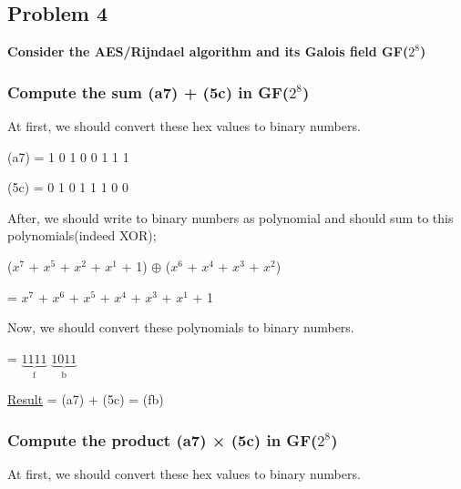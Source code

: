 \documentclass[11pt]{article}
\begin{document}
\newpage
\subsection{Problem 4}
\textbf{Consider the AES/Rijndael algorithm and its Galois field GF($2^{8}$)}
\subsubsection{Compute the sum (a7) + (5c) in GF($2^{8}$)}

At first, we should convert these hex values to binary numbers.\\

\begin{center}
  (a7) = 1 0 1 0 0 1 1 1
\end{center}

\begin{center}
  (5c) = 0 1 0 1 1 1 0 0
\end{center}



After, we should write to binary numbers as polynomial and should sum to this polynomials(indeed XOR);\\


\begin{center}
  ($x^{7}$ + $x^{5}$ + $x^{2}$ + $x^{1}$ + 1) $\oplus$ ($x^{6}$ + $x^{4}$ + $x^{3}$ + $x^{2}$)\\
\end{center}

\begin{center}
  = $x^{7}$ + $x^{6}$ + $x^{5}$ + $x^{4}$ + $x^{3}$ + $x^{1}$ + 1\\
\end{center}


Now, we should convert these polynomials to binary numbers.\\

\begin{center}
  = $\underbrace{1 1 1 1}_\text{f}$ $\underbrace{1 0 1 1}_\text{b}$
\end{center}


\underline{Result} = (a7) + (5c) = (fb)

\subsubsection{Compute the product (a7) × (5c) in GF($2^{8}$)}

At first, we should convert these hex values to binary numbers.\\
\end{document}
